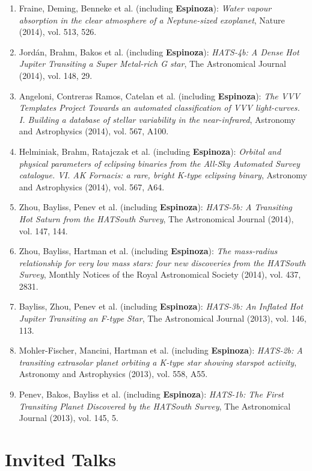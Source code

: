 \documentclass[11pt, a4paper]{article} %
\begin{document}
\begin{flushleft}
\begin{enumerate}
\item Fraine, Deming, Benneke et al. (including \textbf{Espinoza}): \textit{Water vapour absorption in the clear atmosphere of a Neptune-sized exoplanet}, Nature (2014), vol. 513, 526.
\item Jord\'an, Brahm, Bakos et al. (including \textbf{Espinoza}): \textit{HATS-4b: A Dense Hot Jupiter Transiting a Super Metal-rich G star}, The Astronomical Journal (2014), vol. 148, 29.
\item Angeloni, Contreras Ramos, Catelan et al. (including \textbf{Espinoza}): \textit{The VVV Templates Project Towards an automated classification of VVV light-curves. I. Building a database of stellar variability in the near-infrared}, Astronomy and Astrophysics (2014), vol. 567, A100.
\item Helminiak, Brahm, Ratajczak et al. (including \textbf{Espinoza}): \textit{Orbital and physical parameters of eclipsing binaries from the All-Sky Automated Survey catalogue. VI. AK Fornacis: a rare, bright K-type eclipsing binary}, Astronomy and Astrophysics (2014), vol. 567, A64.
\item Zhou, Bayliss, Penev et al. (including \textbf{Espinoza}): \textit{HATS-5b: A Transiting Hot Saturn from the HATSouth Survey}, The Astronomical Journal (2014), vol. 147, 144.
\item Zhou, Bayliss, Hartman et al. (including \textbf{Espinoza}): \textit{The mass-radius relationship for very low mass stars: four new discoveries from the HATSouth Survey}, Monthly Notices of the Royal Astronomical Society (2014), vol. 437, 2831.
\item Bayliss, Zhou, Penev et al. (including \textbf{Espinoza}): \textit{HATS-3b: An Inflated Hot Jupiter Transiting an F-type Star}, The Astronomical Journal (2013), vol. 146, 113.
\item Mohler-Fischer, Mancini, Hartman et al. (including \textbf{Espinoza}): \textit{HATS-2b: A transiting extrasolar planet orbiting a K-type star showing starspot activity}, Astronomy and Astrophysics (2013), vol. 558, A55.
\item Penev, Bakos, Bayliss et al. (including \textbf{Espinoza}): \textit{HATS-1b: The First Transiting Planet Discovered by the HATSouth Survey}, The Astronomical Journal (2013), vol. 145, 5.
\end{enumerate}
\end{flushleft}



\section*{Invited Talks}
\end{document}
